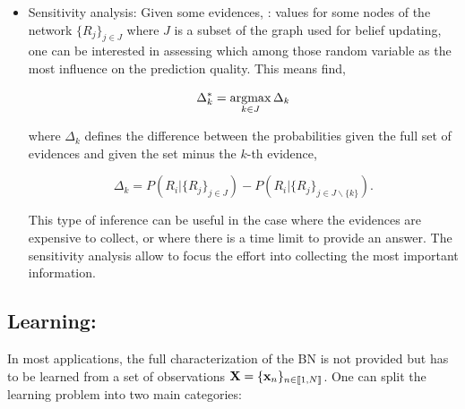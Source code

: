 \documentclass[a4paper,11pt]{report}
\begin{document}
\begin{itemize}
				\item Sensitivity analysis: Given some evidences, \ie: values for some nodes of the network $\{R_{j}\}_{j \in J}$ where $J$ is a subset of the graph used for belief updating, one can be interested in assessing which among those random variable as the most influence on the prediction quality. This means find,
				
				\begin{equation}
					\Delta_{k}^{\ast}= \mathop{\rm argmax}_{k \in J} \Delta_{k}
					\label{eq:BN Sensitivity analysis 1}
				\end{equation}
				
				where $\Delta_{k}$ defines the difference between the probabilities given the full set of evidences and given the set minus the $k$-th evidence,
				
        \begin{equation}
					\Delta_{k} = P(R_{i}|\{R_{j}\}_{j \in J}) - P(R_{i}|\{R_{j}\}_{j \in J\backslash \{k\}}).
					\label{eq:BN Sensitivity analysis 2}
				\end{equation}      
      
				This type of inference can be useful in the case where the evidences are expensive to collect, or where there is a time limit to provide an answer. The sensitivity analysis allow to focus the effort into collecting the most important information.       
      \end{itemize}

      
      
    \subsection{Learning:}
      \label{subsec:PGMs/BN/Learning}
      
      
      In most applications, the full characterization of the BN is not provided but has to be learned from a set of observations ${\bf X} = \{{\bf x}_{n}\}_{n\in \llbracket 1,N \rrbracket}$. One can split the learning problem into two main categories:\\
      
\end{document}
